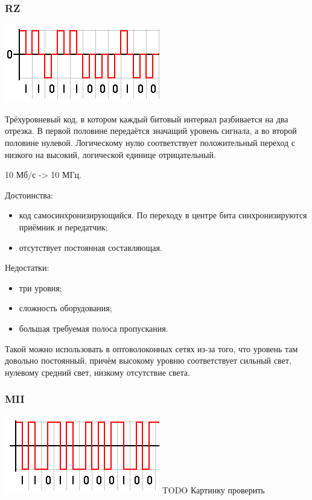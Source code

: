 \documentclass[12pt, russian, oneside, article]{ncc}
\begin{document}
\subsubsection{RZ}
\label{sec-4_7_2}


\includegraphics[]{images/SiSPI/RZcode.png}

Трёхуровневый код, в котором каждый битовый интервал разбивается на два отрезка. В первой половине передаётся значащий уровень сигнала, а во второй половине нулевой. Логическому нулю соответствует положительный переход с низкого на высокий, логической единице отрицательный.

10 Мб/с -> 10 МГц.

Достоинства:
\begin{itemize}
\item код самосинхронизирующийся. По переходу в центре бита синхронизируются приёмник и передатчик;
\item отсутствует постоянная составляющая.
\end{itemize}

Недостатки:
\begin{itemize}
\item три уровня;
\item сложность оборудования;
\item большая требуемая полоса пропускания.
\end{itemize}

Такой можно использовать в оптоволоконных сетях из-за того, что уровень там довольно постоянный, причём высокому уровню соответствует сильный свет, нулевому средний свет, низкому отсутствие света.
\subsubsection{MII}
\label{sec-4_7_3}


\includegraphics[]{images/SiSPI/Manchester_code.png}
TODO Картинку проверить
\end{document}
